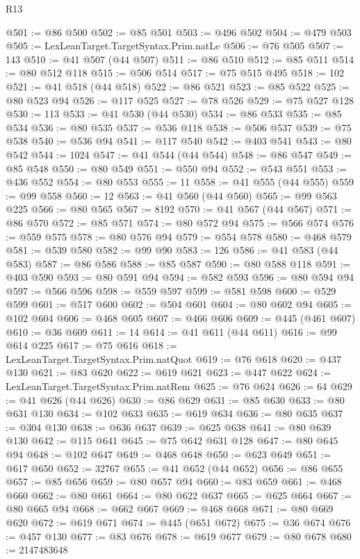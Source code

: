\begin{lexlean}{R13}
\begin{coremodule}
@501 := @86 @500
@502 := @85 @501
@503 := @496 @502
@504 := @479 @503
@505 := LexLeanTarget.TargetSyntax.Prim.natLe
@506 := @76 @505
@507 := 143
@510 := @41 @507 (@44 @507)
@511 := @86 @510
@512 := @85 @511
@514 := @80 @512 @118
@515 := @506 @514
@517 := @75 @515 @495
@518 := 102
@521 := @41 @518 (@44 @518)
@522 := @86 @521
@523 := @85 @522
@525 := @80 @523 @94
@526 := @117 @525
@527 := @78 @526
@529 := @75 @527 @128
@530 := 113
@533 := @41 @530 (@44 @530)
@534 := @86 @533
@535 := @85 @534
@536 := @80 @535
@537 := @536 @118
@538 := @506 @537
@539 := @75 @538
@540 := @536 @94
@541 := @117 @540
@542 := @403 @541
@543 := @80 @542
@544 := 1024
@547 := @41 @544 (@44 @544)
@548 := @86 @547
@549 := @85 @548
@550 := @80 @549
@551 := @550 @94
@552 := @543 @551
@553 := @436 @552
@554 := @80 @553
@555 := 11
@558 := @41 @555 (@44 @555)
@559 := @99 @558
@560 := 12
@563 := @41 @560 (@44 @560)
@565 := @99 @563 @225
@566 := @80 @565
@567 := 8192
@570 := @41 @567 (@44 @567)
@571 := @86 @570
@572 := @85 @571
@574 := @80 @572 @94
@575 := @566 @574
@576 := @559 @575
@578 := @80 @576 @94
@579 := @554 @578
@580 := @468 @579
@581 := @539 @580
@582 := @99 @90
@583 := 126
@586 := @41 @583 (@44 @583)
@587 := @86 @586
@588 := @85 @587
@590 := @80 @588 @118
@591 := @403 @590
@593 := @80 @591 @94
@594 := @582 @593
@596 := @80 @594 @94
@597 := @566 @596
@598 := @559 @597
@599 := @581 @598
@600 := @529 @599
@601 := @517 @600
@602 := @504 @601
@604 := @80 @602 @94
@605 := @102 @604
@606 := @468 @605
@607 := @466 @606
@609 := @445 (@461 @607)
@610 := @36 @609
@611 := 14
@614 := @41 @611 (@44 @611)
@616 := @99 @614 @225
@617 := @75 @616
@618 := LexLeanTarget.TargetSyntax.Prim.natQuot
@619 := @76 @618
@620 := @437 @130
@621 := @83 @620
@622 := @619 @621
@623 := @447 @622
@624 := LexLeanTarget.TargetSyntax.Prim.natRem
@625 := @76 @624
@626 := 64
@629 := @41 @626 (@44 @626)
@630 := @86 @629
@631 := @85 @630
@633 := @80 @631 @130
@634 := @102 @633
@635 := @619 @634
@636 := @80 @635
@637 := @304 @130
@638 := @636 @637
@639 := @625 @638
@641 := @80 @639 @130
@642 := @115 @641
@645 := @75 @642 @631 @128
@647 := @80 @645 @94
@648 := @102 @647
@649 := @468 @648
@650 := @623 @649
@651 := @617 @650
@652 := 32767
@655 := @41 @652 (@44 @652)
@656 := @86 @655
@657 := @85 @656
@659 := @80 @657 @94
@660 := @83 @659
@661 := @468 @660
@662 := @80 @661
@664 := @80 @622 @637
@665 := @625 @664
@667 := @80 @665 @94
@668 := @662 @667
@669 := @468 @668
@671 := @80 @669 @620
@672 := @619 @671
@674 := @445 (@651 @672)
@675 := @36 @674
@676 := @457 @130
@677 := @83 @676
@678 := @619 @677
@679 := @80 @678
@680 := 2147483648

\end{coremodule}
\end{lexlean}
